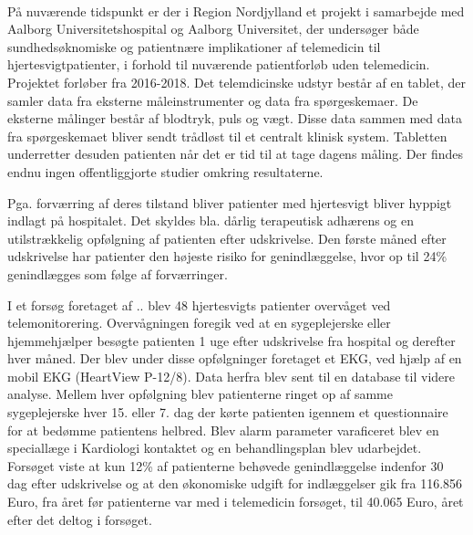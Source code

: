 \\
På nuværende tidspunkt er der i Region Nordjylland et projekt i samarbejde med Aalborg Universitetshospital og Aalborg Universitet, der undersøger både sundhedsøknomiske og patientnære implikationer af telemedicin til hjertesvigtpatienter, i forhold til nuværende patientforløb uden telemedicin. Projektet forløber fra 2016-2018. Det telemdicinske udstyr består af en tablet, der samler data fra eksterne måleinstrumenter og data fra spørgeskemaer. De eksterne målinger består af blodtryk, puls og vægt. Disse data sammen med data fra spørgeskemaet bliver sendt trådløst til et centralt klinisk system. Tabletten underretter desuden patienten når det er tid til at tage dagens måling. Der findes endnu ingen offentliggjorte studier omkring resultaterne. \citep{telemedicnNordjylland}

Pga. forværring af deres tilstand bliver patienter med hjertesvigt bliver hyppigt indlagt på hospitalet. Det skyldes bla. dårlig terapeutisk adhærens og en utilstrækkelig opfølgning af patienten efter udskrivelse. Den første måned efter  udskrivelse har patienter den højeste risiko for genindlæggelse, hvor op til 24\% genindlægges som følge af forværringer. \cite{teleprog} 

I et forsøg foretaget af .. blev 48 hjertesvigts patienter overvåget ved telemonitorering. Overvågningen foregik ved at en sygeplejerske eller hjemmehjælper besøgte patienten 1 uge efter udskrivelse fra hospital og derefter hver måned. Der blev under disse opfølgninger foretaget et EKG, ved hjælp af en mobil EKG (HeartView P-12/8). Data herfra blev sent til en database til videre analyse. Mellem hver opfølgning blev patienterne ringet op af samme sygeplejerske hver 15. eller 7. dag der kørte patienten igennem et questionnaire for at bedømme patientens helbred. Blev alarm parameter varaficeret blev en speciallæge i Kardiologi kontaktet og en behandlingsplan blev udarbejdet. \cite{teleprog} 
Forsøget viste at kun 12\% af patienterne behøvede genindlæggelse indenfor 30 dag efter udskrivelse og at den økonomiske udgift for indlæggelser gik fra 116.856 Euro, fra året før patienterne var med i telemedicin forsøget, til 40.065 Euro, året efter det deltog i forsøget. \cite{teleprog}

